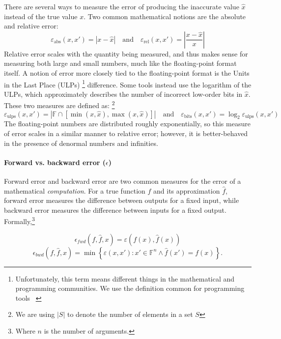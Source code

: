 \documentclass[main.tex]{subfiles}
\begin{document}
There are several ways to measure the error
  of producing the inaccurate value $\hat x$ instead of the true value $x$.
Two common mathematical notions are the absolute and relative error:
\begin{equation*}
  \varepsilon_{\text{abs}}(x, x') = \left|x - \hat x\right|
  \quad \text{and} \quad
  \varepsilon_{\text{rel}}(x, x') = \left|\frac{x - \hat x}{x}\right|
\end{equation*}
Relative error scales with the quantity being measured,
  and thus makes sense for measuring both large and small numbers,
  much like the floating-point format itself.
A notion of error more closely tied to the floating-point format
  is the Units in the Last Place (ULPs)%
\footnote{Unfortunately, this term means different things
  in the mathematical and programming communities.
  We use the definition common for programming tools~%
\cite{pavel15,stoke-fp,stoke-verify}}
 difference.
Some tools instead use the logarithm of the ULPs,
  which approximately describes
  the number of incorrect low-order bits in $\hat x$.
These two measures are defined as:%
\footnote{We are using $|S|$ to denote the number of elements in a set $S$}
\begin{equation*}
\varepsilon_{\text{ulps}}(x, x') = |\mathbb{F} \cap [\min(x, \hat x), \max(x, \hat x)]|
\quad \text{and} \quad
\varepsilon_{\text{bits}}(x, x') = \log_2 \varepsilon_{\text{ulps}}(x, x')
\end{equation*}
The floating-point numbers are distributed roughly exponentially, so
this measure of error scales in a similar manner to relative
error; however, it is better-behaved in the presence of denormal
numbers and infinities.

\paragraph{Forward vs. backward error ($\epsilon$)}

Forward error and backward error are two common measures
  for the error of a mathematical \emph{computation}.
For a true function $f$ and its approximation $\hat f$,
  forward error measures the difference between outputs for a fixed input,
  while backward error measures the difference between inputs
  for a fixed output.
Formally,\footnote{Where $n$ is the number of arguments.}

\begin{equation*}
  \epsilon_{fwd}(f, \hat{f}, x) = \varepsilon(f(x), \hat{f}(x))
\end{equation*}
\begin{equation*}
  \epsilon_{bwd}(f, \hat{f}, x) =
  \min \left\{ \varepsilon(x, x') : x' \in \mathbb{F}^n \land {\hat f}(x') = f(x) \right\}.
\end{equation*}
\end{document}
